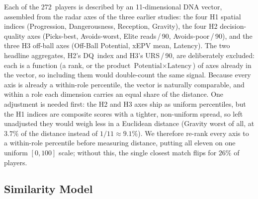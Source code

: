 \documentclass[12pt,a4paper]{article}
\begin{document}
Each of the 272~players is described by an 11-dimensional DNA vector, assembled from the radar axes of the three earlier studies: the four H1 spatial indices (Progression, Dangerousness, Reception, Gravity), the four H2 decision-quality axes (Picks-best, Avoids-worst, Elite reads\,/\,90, Avoids-poor\,/\,90), and the three H3 off-ball axes (Off-Ball Potential, xEPV mean, Latency).
The two headline aggregates, H2's DQ~index and H3's URS\,/\,90, are deliberately excluded: each is a function (a rank, or the product $\text{Potential} \times \text{Latency}$) of axes already in the vector, so including them would double-count the same signal.
Because every axis is already a within-role percentile, the vector is naturally comparable, and within a role each dimension carries an equal share of the distance.
One adjustment is needed first: the H2 and H3 axes ship as uniform percentiles, but the H1 indices are composite scores with a tighter, non-uniform spread, so left unadjusted they would weigh less in a Euclidean distance (Gravity worst of all, at $3.7\%$ of the distance instead of $1/11 \approx 9.1\%$).
We therefore re-rank every axis to a within-role percentile before measuring distance, putting all eleven on one uniform $[0,100]$ scale; without this, the single closest match flips for $26\%$ of players.

\subsection{Similarity Model}\label{sec:h4-similarity}
\end{document}
